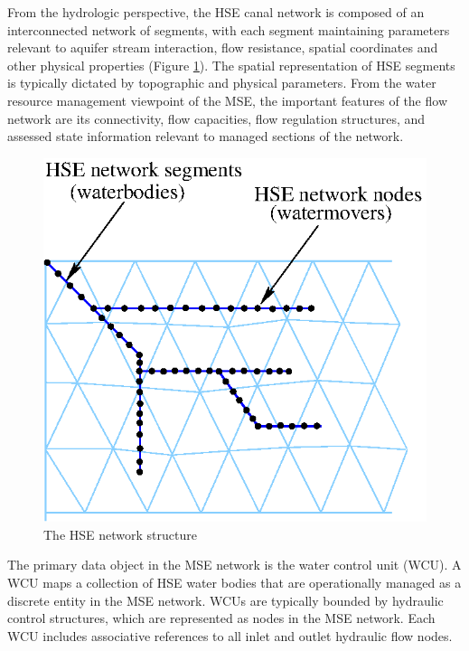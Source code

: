 From the hydrologic perspective, the HSE canal network is composed of
an interconnected network of segments, with each segment maintaining
parameters relevant to aquifer stream interaction, flow resistance,
spatial coordinates and other physical properties (Figure
\ref{fig:hseNetwork}). The spatial representation of HSE segments is
typically dictated by topographic and physical parameters. From the
water resource management viewpoint of the MSE, the important features
of the flow network are its connectivity, flow capacities, flow
regulation structures, and assessed state information relevant to
managed sections of the network. 

\begin{figure}
 \begin{center}
  \includegraphics[scale=0.75]{Graphics/hseNetwork.eps}
 \end{center}
 \caption{\label{fig:hseNetwork} The HSE network structure}        
\end{figure}

The primary data object in the MSE network is the water control unit
(WCU). A WCU maps a collection of HSE water bodies that are
operationally managed as a discrete entity in the MSE network. WCUs
are typically bounded by hydraulic control structures, which are
represented as nodes in the MSE network. Each WCU includes associative
references to all inlet and outlet hydraulic flow nodes.

